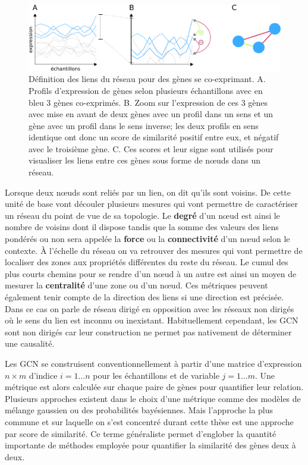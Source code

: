 \begin{figure}[h!]
    \centering
    \includegraphics[width=\textwidth]{img/intro/3_coexpr/intro_3_coexpr_expr_group_sign.pdf}
    \caption[Définition des liens du réseau pour des gènes se co-exprimant.]{Définition des liens du réseau pour des gènes se co-exprimant. A. Profils d'expression de gènes selon plusieurs échantillons avec en bleu 3 gènes co-exprimés. B. Zoom sur l'expression de ces 3 gènes avec mise en avant de deux gènes avec un profil dans un sens et un gène avec un profil dans le sens inverse; les deux profils en sens identique ont donc un score de similarité positif entre eux, et négatif avec le troisième gène. C. Ces scores et leur signe sont utilisés pour visualiser les liens entre ces gènes sous forme de nœuds dans un réseau.}
    \label{fig:coexpr_corr_weight_sign}
\end{figure}

Lorsque deux nœuds sont reliés par un lien, on dit qu'ils sont voisins. De cette unité de base vont découler plusieurs mesures qui vont permettre de caractériser un réseau du point de vue de sa topologie. Le \textbf{degré} d'un nœud est ainsi le nombre de voisins dont il dispose tandis que la somme des valeurs des liens pondérés ou non sera appelée la \textbf{force} ou la \textbf{connectivité} d'un nœud selon le contexte. À l'échelle du réseau on va retrouver des mesures qui vont permettre de localiser des zones aux propriétés différentes du reste du réseau. Le cumul des plus courts chemins pour se rendre d'un nœud à un autre est ainsi un moyen de mesurer la \textbf{centralité} d'une zone ou d'un nœud. Ces métriques peuvent également tenir compte de la direction des liens si une direction est précisée. Dans ce cas on parle de réseau dirigé en opposition avec les réseaux non dirigés où le sens du lien est inconnu ou inexistant. Habituellement cependant, les \acrshort{GCN} sont non dirigés car leur construction ne permet pas nativement de déterminer une causalité. 

Les \acrshort{GCN} se construisent conventionnellement à partir d'une matrice d'expression $n \times m$ d'indice $i = 1 \dots n$ pour les échantillons et de variable $j = 1 \dots m$. Une métrique est alors calculée sur chaque paire de gènes pour quantifier leur relation. Plusieurs approches existent dans le choix d'une métrique comme des modèles de mélange gaussien ou des probabilités bayésiennes. Mais l'approche la plus commune et sur laquelle on s'est concentré durant cette thèse est une approche par score de similarité. Ce terme généraliste permet d'englober la quantité importante de méthodes employée pour quantifier la similarité des gènes deux à deux. 



